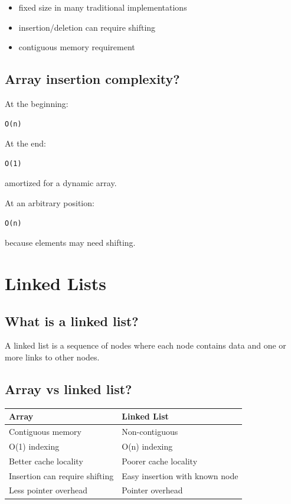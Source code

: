 \begin{itemize}
  \item fixed size in many traditional implementations
  \item insertion/deletion can require shifting
  \item contiguous memory requirement
\end{itemize}

\medskip

\subsection{Array insertion complexity?}

At the beginning:

\begin{lstlisting}
O(n)
\end{lstlisting}

At the end:

\begin{lstlisting}
O(1)
\end{lstlisting}

amortized for a dynamic array.

At an arbitrary position:

\begin{lstlisting}
O(n)
\end{lstlisting}

because elements may need shifting.

\medskip

\section{Linked Lists}

\subsection{What is a linked list?}

A linked list is a sequence of nodes where each node contains data and one or more links to other nodes.

\medskip

\subsection{Array vs linked list?}

\begin{center}
\setlength{\tabcolsep}{6pt}
\renewcommand{\arraystretch}{1.2}
\begin{tabular}{|l|l|}
\hline
\textbf{Array} & \textbf{Linked List} \\
\hline
Contiguous memory & Non-contiguous \\
O(1) indexing & O(n) indexing \\
Better cache locality & Poorer cache locality \\
Insertion can require shifting & Easy insertion with known node \\
Less pointer overhead & Pointer overhead \\
\hline
\end{tabular}
\end{center}

